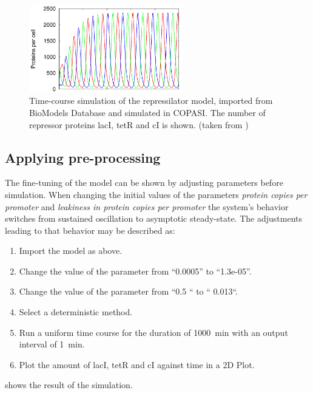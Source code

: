 \begin{figure}
\centering
\includegraphics[width=0.6\textwidth]{images/simEx1.png}
\caption{Time-course simulation of the repressilator model, imported from BioModels Database and simulated in COPASI. The number of repressor proteins lacI, tetR and cI is shown. (taken from \citep{Waltemath:2011})}
\label{fig:simEx1}
\end{figure}

\subsection{Applying pre-processing}
\label{sec:examplePreprocessing}
The fine-tuning of the model can be shown by adjusting parameters before simulation. When changing the initial values of the parameters \emph{protein copies per promoter} and \emph{leakiness in protein copies per promoter} the system's behavior switches from sustained oscillation to asymptotic steady-state. The adjustments leading to that behavior may be described as: 

\begin{enumerate}
\item{Import the model as above.}
\item{Change the value of the parameter  from “0.0005” to “1.3e-05”. }
\item{Change the value of the parameter  from “0.5 “ to “ 0.013“.}
\item{Select a deterministic method.}
\item{Run a uniform time course for the duration of 1000~min with an output interval of 1~min.}
\item Plot the amount of lacI, tetR and cI against time in a 2D Plot.
\end{enumerate}

 shows the result of the simulation.

